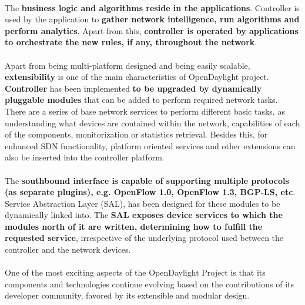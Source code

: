 \documentclass[a4paper, 12pt]{book}
\begin{document}
\\
The \textbf{business logic and algorithms reside in the applications}. Controller is used by the application to \textbf{gather network intelligence, run algorithms and perform analytics}. Apart from this, \textbf{controller is operated by applications to orchestrate the new rules, if any, throughout the network}.\\
\\
Apart from being multi-platform designed and being easily scalable, \textbf{extensibility} is one of the main characteristics of OpenDaylight project. \textbf{Controller} has been implemented \textbf{to be upgraded by dynamically pluggable modules} that can be added to perform required network tasks. There are a series of base network services to perform different basic tasks, as understanding what devices are contained within the network, capabilities of each of the components, monitorization or statistics retrieval. Besides this, for enhanced SDN functionality, platform oriented services and other extensions can also be inserted into the controller platform.\\
\\
The \textbf{southbound interface is capable of supporting multiple protocols (as separate plugins), e.g. OpenFlow 1.0, OpenFlow 1.3, BGP-LS, etc}. Service Abstraction Layer (SAL), has been designed for these modules to be dynamically linked into. The \textbf{SAL exposes device services to which the modules north of it are written, determining how to fulfill the requested service}, irrespective of the underlying protocol used between the controller and the network devices.\\
\\
One of the most exciting aspects of the OpenDaylight Project is that its components and technologies continue evolving based on the contributions of its developer community, favored by its extensible and modular design.
\end{document}
